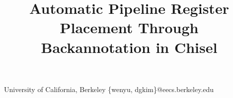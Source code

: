 \documentclass[10pt,nocopyrightspace]{sigplanconf}
\begin{document}
\preprintfooter{}   %

\title{Automatic Pipeline Register Placement Through Backannotation in Chisel}
\subtitle{}

           {University of California, Berkeley}
           {\{wenyu, dgkim\}@eecs.berkeley.edu}

\maketitle









\setlength{\bibsep}{0.0pt}
\renewcommand*{\bibfont}{\footnotesize}

\end{document}
